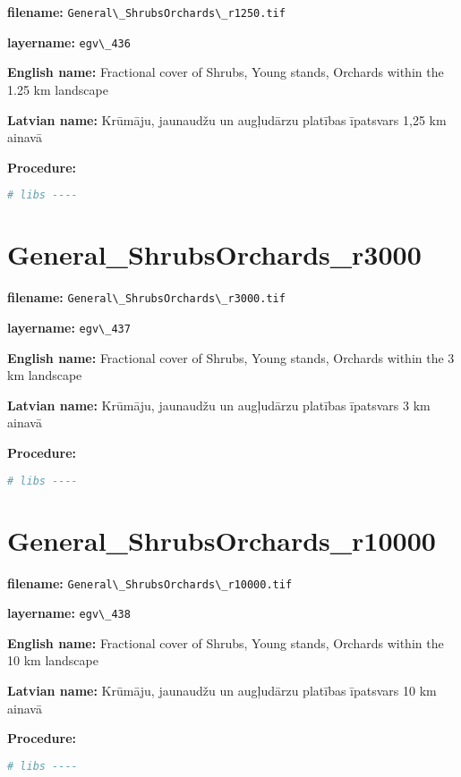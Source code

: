 \documentclass[
]{book}
\newcommand{\passthrough}[1]{#1}
\begin{document}
\textbf{filename:} \passthrough{\lstinline!General\_ShrubsOrchards\_r1250.tif!}

\textbf{layername:} \passthrough{\lstinline!egv\_436!}

\textbf{English name:} Fractional cover of Shrubs, Young stands, Orchards within the 1.25 km landscape

\textbf{Latvian name:} Krūmāju, jaunaudžu un augļudārzu platības īpatsvars 1,25 km ainavā

\textbf{Procedure:}

\begin{lstlisting}[language=R]
# libs ----
\end{lstlisting}

\section{General\_ShrubsOrchards\_r3000}\label{ch06.437}

\textbf{filename:} \passthrough{\lstinline!General\_ShrubsOrchards\_r3000.tif!}

\textbf{layername:} \passthrough{\lstinline!egv\_437!}

\textbf{English name:} Fractional cover of Shrubs, Young stands, Orchards within the 3 km landscape

\textbf{Latvian name:} Krūmāju, jaunaudžu un augļudārzu platības īpatsvars 3 km ainavā

\textbf{Procedure:}

\begin{lstlisting}[language=R]
# libs ----
\end{lstlisting}

\section{General\_ShrubsOrchards\_r10000}\label{ch06.438}

\textbf{filename:} \passthrough{\lstinline!General\_ShrubsOrchards\_r10000.tif!}

\textbf{layername:} \passthrough{\lstinline!egv\_438!}

\textbf{English name:} Fractional cover of Shrubs, Young stands, Orchards within the 10 km landscape

\textbf{Latvian name:} Krūmāju, jaunaudžu un augļudārzu platības īpatsvars 10 km ainavā

\textbf{Procedure:}

\begin{lstlisting}[language=R]
# libs ----
\end{lstlisting}
\end{document}
